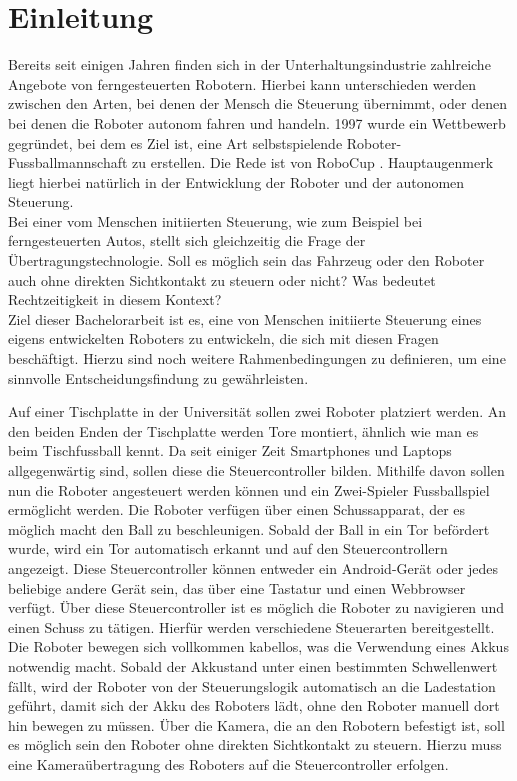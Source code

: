 \chapter{Einleitung}
\label{ch:einleitung}

Bereits seit einigen Jahren finden sich in der Unterhaltungsindustrie zahlreiche Angebote von ferngesteuerten Robotern. Hierbei kann unterschieden werden zwischen den Arten, bei denen der Mensch die Steuerung übernimmt, oder denen bei denen die Roboter autonom fahren und handeln. 1997 wurde ein Wettbewerb gegründet, bei dem es Ziel ist, eine Art selbstspielende Roboter-Fussballmannschaft zu erstellen. Die Rede ist von RoboCup \cite{ROBOCUP}. Hauptaugenmerk liegt hierbei natürlich in der Entwicklung der Roboter und der autonomen Steuerung. \\
Bei einer vom Menschen initiierten Steuerung, wie zum Beispiel bei ferngesteuerten Autos, stellt sich gleichzeitig die Frage der Übertragungstechnologie. Soll es möglich sein das Fahrzeug oder den Roboter auch ohne direkten Sichtkontakt zu steuern oder nicht? Was bedeutet Rechtzeitigkeit in diesem Kontext? \\
Ziel dieser Bachelorarbeit ist es, eine von Menschen initiierte Steuerung eines eigens entwickelten Roboters zu entwickeln, die sich mit diesen Fragen beschäftigt. Hierzu sind noch weitere Rahmenbedingungen zu definieren, um eine sinnvolle Entscheidungsfindung zu gewährleisten.


Auf einer Tischplatte in der Universität sollen zwei Roboter platziert werden. An den beiden Enden der Tischplatte werden Tore montiert, ähnlich wie man es beim Tischfussball kennt. Da seit einiger Zeit Smartphones und Laptops allgegenwärtig sind, sollen diese die Steuercontroller bilden. Mithilfe davon sollen nun die Roboter angesteuert werden können und ein Zwei-Spieler Fussballspiel ermöglicht werden. Die Roboter verfügen über einen Schussapparat, der es möglich macht den Ball zu beschleunigen. Sobald der Ball in ein Tor befördert wurde, wird ein Tor automatisch erkannt und auf den Steuercontrollern angezeigt. Diese Steuercontroller können entweder ein Android-Gerät oder jedes beliebige andere Gerät sein, das über eine Tastatur und einen Webbrowser verfügt. Über diese Steuercontroller ist es möglich die Roboter zu navigieren und einen Schuss zu tätigen. Hierfür werden verschiedene Steuerarten bereitgestellt. 
Die Roboter bewegen sich vollkommen kabellos, was die Verwendung eines Akkus notwendig macht. Sobald der Akkustand unter einen bestimmten Schwellenwert fällt, wird der Roboter von der Steuerungslogik automatisch an die Ladestation geführt, damit sich der Akku des Roboters lädt, ohne den Roboter manuell dort hin bewegen zu müssen. Über die Kamera, die an den Robotern befestigt ist, soll es möglich sein den Roboter ohne direkten Sichtkontakt zu steuern. Hierzu muss eine Kameraübertragung des Roboters auf die Steuercontroller erfolgen.\\

